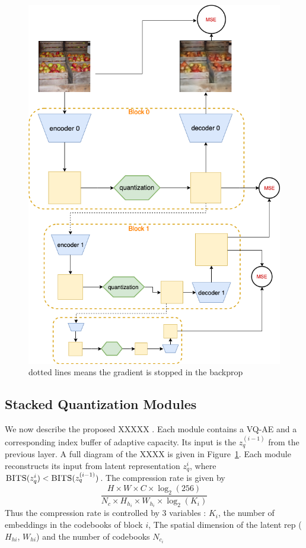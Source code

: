 \documentclass[colorinlistoftodos]{article} %
\begin{document}
\begin{figure}
    \centering
    \includegraphics[width=\linewidth]{figs/sqm_cartoon.png}
    \caption{dotted lines means the gradient is stopped in the backprop}
    \label{fig:soft_modules}
\end{figure}

\subsection{Stacked Quantization Modules}
We now describe the proposed XXXXX . Each module contains a VQ-AE and a corresponding index buffer of adaptive capacity. Its input is the $z_q^{(i-1)}$ from the previous layer. A full diagram of the XXXX is given in Figure~\ref{fig:soft_modules}. Each module reconstructs its input from latent representation $z_q^{i}$, where $\textsc{BITS}(z_q^{i}) < \textsc{BITS}(z_q^{(i-1)})$. The compression rate is given by
$$
    \frac{H \times W \times C \times  \log_2{(256)}}
         {N_c \times H_h_i \times W_h_i \times \log_2{(K_i)}}
$$
Thus the compression rate is controlled by 3 variables : $K_i$, the number of embeddings in the codebooks of block $i$, The spatial dimension of the latent rep ($H_{hi}$, $W_{hi}$) and the number of codebooks $N_c_i$ 
\end{document}

